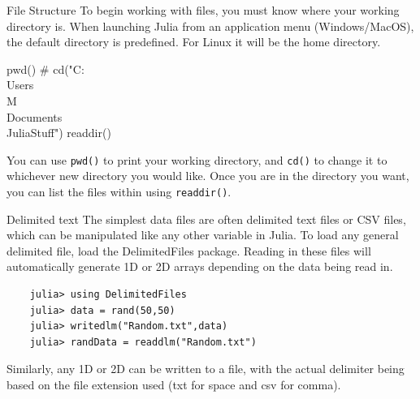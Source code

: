 \documentclass{beamer}
\newenvironment{Boxx}{\begin{tcolorbox}[standard jigsaw, opacityframe=0.8, opacityback=0.0,left=2pt,right=2pt,top=0pt,bottom=0pt]}{\end{tcolorbox}}
\begin{document}
\begin{frame}[fragile]{File Structure}
	To begin working with files, you must know where your working directory is. When launching Julia from an application menu (Windows/MacOS), the default directory is predefined. For Linux it will be the home directory. 
  \begin{Boxx}
  \begin{jllisting}
	pwd()
	# cd("C:\\Users\\M\\Documents\\JuliaStuff")
	readdir()
	\end{jllisting}
  \end{Boxx}
	You can use \verb|pwd()| to print your working directory, and \verb|cd()| to change it to whichever new directory you would like.	Once you are in the directory you want, you can list the files within using \verb|readdir()|.
\end{frame}


\begin{frame}[fragile]{Delimited text}
	The simplest data files are often delimited text files or CSV files, which can be manipulated like any other variable in Julia. To load any general delimited file, load the DelimitedFiles package. Reading in these files will automatically generate 1D or 2D arrays depending on the data being read in.
	
	\begin{lstlisting}
	julia> using DelimitedFiles
	julia> data = rand(50,50)
	julia> writedlm("Random.txt",data)
	julia> randData = readdlm("Random.txt")
	\end{lstlisting}
	
\vspace*{0.5cm}
	Similarly, any 1D or 2D can be written to a file, with the actual delimiter being based on the file extension used (txt for space and csv for comma).
\end{frame}
\end{document}
